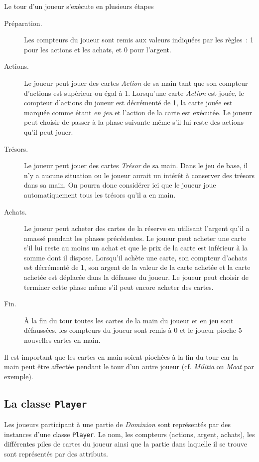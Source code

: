 \documentclass[12pt]{td}
\begin{document}
Le tour d'un joueur s'exécute en plusieurs étapes
\begin{description}
	\item[Préparation.] Les compteurs du joueur sont remis aux valeurs indiquées par les règles~: 1 pour les actions et les achats, et 0 pour l'argent.
	\item[Actions.] Le joueur peut jouer des cartes \emph{Action} de sa main tant que son compteur d'actions est supérieur ou égal à 1. Lorsqu'une carte \emph{Action} est jouée, le compteur d'actions du joueur est décrémenté de 1, la carte jouée est marquée comme étant \emph{en jeu} et l'action de la carte est exécutée. Le joueur peut choisir de passer à la phase suivante même s'il lui reste des actions qu'il peut jouer.
	\item[Trésors.] Le joueur peut jouer des cartes \emph{Trésor} de sa main. Dans le jeu de base, il n'y a aucune situation ou le joueur aurait un intérêt à conserver des trésors dans sa main. On pourra donc considérer ici que le joueur joue automatiquement tous les trésors qu'il a en main.
	\item[Achats.] Le joueur peut acheter des cartes de la réserve en utilisant l'argent qu'il a amassé pendant les phases précédentes. Le joueur peut acheter une carte s'il lui reste au moins un achat et que le prix de la carte est inférieur à la somme dont il dispose. Lorsqu'il achète une carte, son compteur d'achats est décrémenté de 1, son argent de la valeur de la carte achetée et la carte achetée est déplacée dans la défausse du joueur. Le joueur peut choisir de terminer cette phase même s'il peut encore acheter des cartes.
	\item[Fin.] À la fin du tour toutes les cartes de la main du joueur et en jeu sont défaussées, les compteurs du joueur sont remis à 0 et le joueur pioche 5 nouvelles cartes en main.
\end{description}
	\rmq Il est important que les cartes en main soient piochées à la fin du tour car la main peut être affectée pendant le tour d'un autre joueur (cf. \emph{Militia} ou \emph{Moat} par exemple).

\subsection{La classe \texttt{Player}}

Les joueurs participant à une partie de \emph{Dominion} sont représentés par des instances d'une classe \texttt{Player}. Le nom, les compteurs (actions, argent, achats), les différentes piles de cartes du joueur ainsi que la partie dans laquelle il se trouve sont représentés par des attributs.
\end{document}
